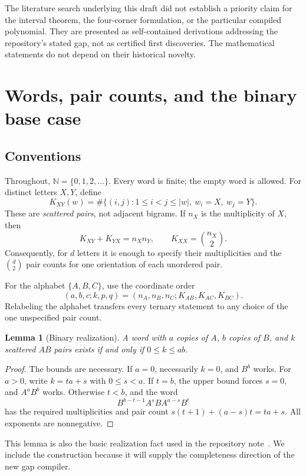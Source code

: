 \documentclass[11pt,letterpaper]{article}
\newtheorem{lemma}[theorem]{Lemma}
\theoremstyle{definition}
\theoremstyle{remark}
\newcommand{\N}{\mathbb N}
\begin{document}
The literature search underlying this draft did not establish a priority claim for the interval theorem, the four-corner formulation, or the particular compiled polynomial. They are presented as self-contained derivations addressing the repository's stated gap, not as certified first discoveries. The mathematical statements do not depend on their historical novelty.

\section{Words, pair counts, and the binary base case}
\subsection{Conventions}
Throughout, $\N=\{0,1,2,\ldots\}$. Every word is finite; the empty word is allowed. For distinct letters $X,Y$, define
\[
 K_{XY}(w)=\#\{(i,j):1\le i<j\le |w|,\ w_i=X,\ w_j=Y\}.
\]
These are \emph{scattered pairs}, not adjacent bigrams. If $n_X$ is the multiplicity of $X$, then
\begin{equation}\label{gts:po:eq:reverse}
 K_{XY}+K_{YX}=n_Xn_Y,\qquad
 K_{XX}=\binom{n_X}{2}.
\end{equation}
Consequently, for $d$ letters it is enough to specify their multiplicities and the $\binom d2$ pair counts for one orientation of each unordered pair.

For the alphabet $\{A,B,C\}$, use the coordinate order
\begin{equation}\label{gts:po:eq:profile}
 (a,b,c;k,p,q)=(n_A,n_B,n_C;K_{AB},K_{AC},K_{BC}).
\end{equation}
Relabeling the alphabet transfers every ternary statement to any choice of the one unspecified pair count.

\begin{lemma}[Binary realization]\label{gts:po:lem:binary}
A word with $a$ copies of $A$, $b$ copies of $B$, and $k$ scattered $AB$ pairs exists if and only if $0\le k\le ab$.
\end{lemma}
\begin{proof}
The bounds are necessary. If $a=0$, necessarily $k=0$, and $B^b$ works. For $a>0$, write $k=ta+s$ with $0\le s<a$. If $t=b$, the upper bound forces $s=0$, and $A^aB^b$ works. Otherwise $t<b$, and the word
\begin{equation}\label{gts:po:eq:binaryword}
 B^{b-t-1}A^sBA^{a-s}B^t
\end{equation}
has the required multiplicities and pair count
$s(t+1)+(a-s)t=ta+s$. All exponents are nonnegative.
\end{proof}
This lemma is also the basic realization fact used in the repository note~\cite{po-repo}. We include the construction because it will supply the completeness direction of the new gap compiler.
\end{document}
